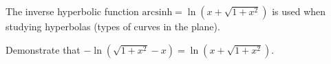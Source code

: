 \begin{frame}

The inverse hyperbolic function $\text{arcsinh}= \ln \left( x+\sqrt{1+x^2}\right)$ is used when studying hyperbolas (types of curves in the plane).
\begin{example}
Demonstrate that $-\ln \left(\sqrt{1+x^2}-x\right)=\ln \left( x+\sqrt{1+x^2}\right)$.

\end{example}
\end{frame}